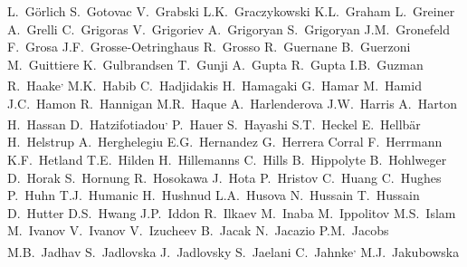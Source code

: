 \begin{flushleft}
L.~G\"{o}rlich\And 
S.~Gotovac\And 
V.~Grabski\And 
L.K.~Graczykowski\And 
K.L.~Graham\And 
L.~Greiner\And 
A.~Grelli\And 
C.~Grigoras\And 
V.~Grigoriev\And 
A.~Grigoryan\And 
S.~Grigoryan\And 
J.M.~Gronefeld\And 
F.~Grosa\And 
J.F.~Grosse-Oetringhaus\And 
R.~Grosso\And 
R.~Guernane\And 
B.~Guerzoni\And 
M.~Guittiere\And 
K.~Gulbrandsen\And 
T.~Gunji\And 
A.~Gupta\And 
R.~Gupta\And 
I.B.~Guzman\And 
R.~Haake\textsuperscript{,}\And 
M.K.~Habib\And 
C.~Hadjidakis\And 
H.~Hamagaki\And 
G.~Hamar\And 
M.~Hamid\And 
J.C.~Hamon\And 
R.~Hannigan\And 
M.R.~Haque\And 
A.~Harlenderova\And 
J.W.~Harris\And 
A.~Harton\And 
H.~Hassan\And 
D.~Hatzifotiadou\textsuperscript{,}\And 
P.~Hauer\And 
S.~Hayashi\And 
S.T.~Heckel\And 
E.~Hellb\"{a}r\And 
H.~Helstrup\And 
A.~Herghelegiu\And 
E.G.~Hernandez\And 
G.~Herrera Corral\And 
F.~Herrmann\And 
K.F.~Hetland\And 
T.E.~Hilden\And 
H.~Hillemanns\And 
C.~Hills\And 
B.~Hippolyte\And 
B.~Hohlweger\And 
D.~Horak\And 
S.~Hornung\And 
R.~Hosokawa\And 
J.~Hota\And 
P.~Hristov\And 
C.~Huang\And 
C.~Hughes\And 
P.~Huhn\And 
T.J.~Humanic\And 
H.~Hushnud\And 
L.A.~Husova\And 
N.~Hussain\And 
T.~Hussain\And 
D.~Hutter\And 
D.S.~Hwang\And 
J.P.~Iddon\And 
R.~Ilkaev\And 
M.~Inaba\And 
M.~Ippolitov\And 
M.S.~Islam\And 
M.~Ivanov\And 
V.~Ivanov\And 
V.~Izucheev\And 
B.~Jacak\And 
N.~Jacazio\And 
P.M.~Jacobs\And 
M.B.~Jadhav\And 
S.~Jadlovska\And 
J.~Jadlovsky\And 
S.~Jaelani\And 
C.~Jahnke\textsuperscript{,}\And 
M.J.~Jakubowska\And 

\end{flushleft}
